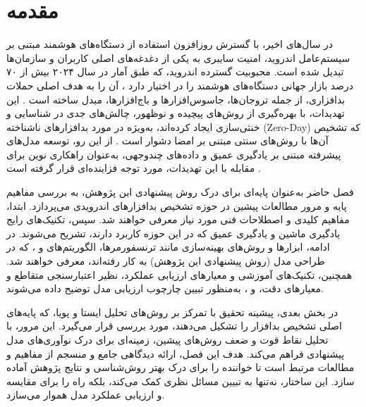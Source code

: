 \section{مقدمه}
در سال‌های اخیر، با گسترش روزافزون استفاده از دستگاه‌های هوشمند مبتنی بر سیستم‌عامل اندروید، امنیت سایبری به یکی از دغدغه‌های اصلی کاربران و سازمان‌ها تبدیل شده است. محبوبیت گسترده اندروید، که طبق آمار  در سال ۲۰۲۴ بیش از ۷۰ درصد بازار جهانی دستگاه‌های هوشمند را در اختیار دارد \cite{Statista2024}، آن را به هدف اصلی حملات بدافزاری، از جمله تروجان‌ها، جاسوس‌افزارها و باج‌افزارها، مبدل ساخته است \cite{AndroidSecurity}. این تهدیدات، با بهره‌گیری از روش‌های پیچیده و نوظهور، چالش‌های جدی در شناسایی و خنثی‌سازی ایجاد کرده‌اند، به‌ویژه در مورد بدافزارهای ناشناخته (Zero-Day) که تشخیص آن‌ها با روش‌های سنتی مبتنی بر امضا دشوار است \cite{AndroidMalwareSurvey}. از این رو، توسعه مدل‌های پیشرفته مبتنی بر یادگیری عمیق و داده‌های چندوجهی، به‌عنوان راهکاری نوین برای مقابله با این تهدیدات، مورد توجه فزاینده‌ای قرار گرفته است \cite{DeepLearningMalware}.

فصل حاضر به‌عنوان پایه‌ای برای درک روش پیشنهادی این پژوهش، به بررسی مفاهیم پایه و مرور مطالعات پیشین در حوزه تشخیص بدافزارهای اندرویدی می‌پردازد. ابتدا، مفاهیم کلیدی و اصطلاحات فنی مورد نیاز معرفی خواهند شد. سپس، تکنیک‌های رایج یادگیری ماشین و یادگیری عمیق که در این حوزه کاربرد دارند، تشریح می‌شوند. در ادامه، ابزارها و روش‌های بهینه‌سازی مانند ترنسفورمرها، الگوریتم‌های  و ، که در طراحی مدل  (روش پیشنهادی این پژوهش) به کار رفته‌اند، معرفی خواهند شد. همچنین، تکنیک‌های آموزشی و معیارهای ارزیابی عملکرد، نظیر اعتبارسنجی متقاطع و معیارهای دقت،  و ، به‌منظور تبیین چارچوب ارزیابی مدل توضیح داده می‌شوند.

در بخش بعدی، پیشینه تحقیق با تمرکز بر روش‌های تحلیل ایستا و پویا، که پایه‌های اصلی تشخیص بدافزار را تشکیل می‌دهند، مورد بررسی قرار می‌گیرد. این مرور، با تحلیل نقاط قوت و ضعف روش‌های پیشین، زمینه‌ای برای درک نوآوری‌های مدل پیشنهادی فراهم می‌کند. هدف این فصل، ارائه دیدگاهی جامع و منسجم از مفاهیم و مطالعات مرتبط است تا خواننده را برای درک بهتر روش‌شناسی و نتایج پژوهش آماده سازد. این ساختار، نه‌تنها به تبیین مسائل نظری کمک می‌کند، بلکه راه را برای مقایسه و ارزیابی عملکرد مدل  هموار می‌سازد.

